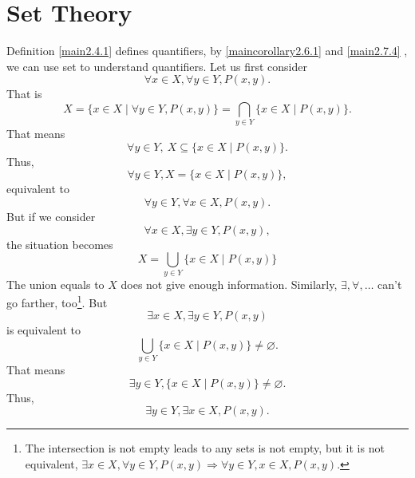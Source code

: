 \documentclass{article}
\theoremstyle{1}
\begin{document}
\section{Set Theory}
Definition \ref{main2.4.1} defines quantifiers, by 
\ref{maincorollary2.6.1} and \ref{main2.7.4} , we can use set to understand quantifiers.
Let us first consider 
\begin{equation}
    \forall x\in X, \forall y\in Y, P(x,y).
\end{equation}
That is 
\begin{equation}
    X=\{x\in X \mid \forall y\in Y, P(x,y)\}=\bigcap_{y\in Y}\{x\in X \mid P(x,y)\}.
\end{equation}
That means 
\begin{equation}
    \forall y\in Y,\ X\subseteq\{x\in X \mid P(x,y)\}.
\end{equation}
Thus, 
\begin{equation}
    \forall y\in Y, X=\{x\in X\mid P(x,y)\},
\end{equation}
equivalent to 
\begin{equation}
    \forall y\in Y,\forall x\in X ,P(x,y).
\end{equation}
But if we consider
\begin{equation}
    \forall x\in X, \exists y\in Y, P(x,y),
\end{equation}
the situation becomes
\begin{equation}
    X=\bigcup_{y\in Y}\{x\in X\mid P(x,y)\}
\end{equation}
The union equals to $X$ does not give enough information. Similarly, $\exists,\forall,\dots$ can't go farther, too\footnote{The intersection is not empty leads to any sets is not empty, but it is not equivalent, $\exists x\in X,\forall y\in Y,P(x,y)\Rightarrow\forall y\in Y,x\in X,P(x,y).$}. But
\begin{equation}
    \exists x\in X, \exists y\in Y, P(x,y)
\end{equation}
is equivalent to 
\begin{equation}
    \bigcup_{y\in Y}\{x\in X\mid P(x,y)\}\not=\varnothing.
\end{equation}
That means 
\begin{equation}
    \exists y\in Y, \{x\in X \mid P(x,y)\}\not=\varnothing.
\end{equation}
Thus, 
\begin{equation}
    \exists y\in Y,\exists x\in X, P(x,y).
\end{equation}
\end{document}
